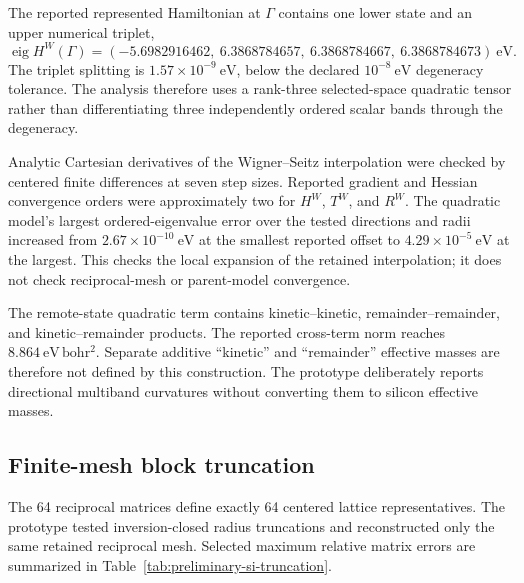 The reported represented Hamiltonian at $\Gamma$ contains one lower state and
an upper numerical triplet,
\begin{equation}
  \operatorname{eig} H^W(\Gamma)
  =(-5.6982916462,\ 6.3868784657,\ 6.3868784667,\ 6.3868784673)\ \mathrm{eV}.
\end{equation}
The triplet splitting is $1.57\times10^{-9}\ \mathrm{eV}$, below the declared
$10^{-8}\ \mathrm{eV}$ degeneracy tolerance. The analysis therefore uses a
rank-three selected-space quadratic tensor rather than differentiating three
independently ordered scalar bands through the degeneracy.

Analytic Cartesian derivatives of the Wigner--Seitz interpolation were checked
by centered finite differences at seven step sizes. Reported gradient and
Hessian convergence orders were approximately two for $H^W$, $T^W$, and
$R^W$. The quadratic model's largest ordered-eigenvalue error over the tested
directions and radii increased from $2.67\times10^{-10}\ \mathrm{eV}$ at the
smallest reported offset to $4.29\times10^{-5}\ \mathrm{eV}$ at the largest.
This checks the local expansion of the retained interpolation; it does not
check reciprocal-mesh or parent-model convergence.

The remote-state quadratic term contains kinetic--kinetic,
remainder--remainder, and kinetic--remainder products. The reported cross-term
norm reaches $8.864\ \mathrm{eV\,bohr^2}$. Separate additive ``kinetic'' and
``remainder'' effective masses are therefore not defined by this construction.
The prototype deliberately reports directional multiband curvatures without
converting them to silicon effective masses.

\subsection{Finite-mesh block truncation}

The 64 reciprocal matrices define exactly 64 centered lattice representatives.
The prototype tested inversion-closed radius truncations and reconstructed only
the same retained reciprocal mesh. Selected maximum relative matrix errors are
summarized in Table~\ref{tab:preliminary-si-truncation}.

